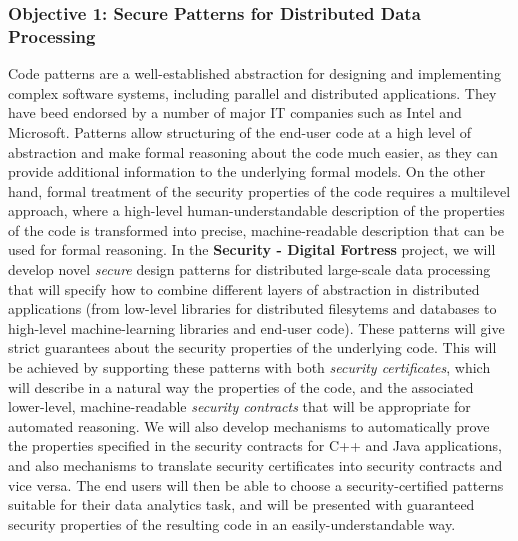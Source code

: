 \documentclass[a4paper,11pt]{article}
\newcommand{\project}[1]{\textbf{#1}\xspace}
\newcommand{\SECURITY}{\project{Security - Digital Fortress}}
\newcommand{\TheProject}{\SECURITY}
\begin{document}
\subsubsection*{Objective 1: Secure Patterns for Distributed Data Processing}
\vspace{-6pt}
Code patterns are a well-established abstraction for designing and implementing complex software systems, including parallel and distributed applications.  They have beed endorsed by a number of major IT companies such as Intel and Microsoft. Patterns allow structuring of the end-user code at a high level of abstraction and make formal reasoning about the code much easier, as they can provide additional information to the underlying formal models. On the other hand, formal treatment of the security properties of the code requires a multilevel approach, where a high-level human-understandable description of the properties of the code is transformed into precise, machine-readable description that can be used for formal reasoning. In the \TheProject{} project, we will develop novel \emph{secure} design patterns for distributed large-scale data processing that will specify how to combine different layers of abstraction in distributed applications (from low-level libraries for distributed filesytems and databases to high-level machine-learning libraries and end-user code). These patterns will give strict guarantees about the security properties of the underlying code. This will be achieved by supporting these patterns with both \emph{security certificates}, which will describe in a natural way the properties of the code, and the associated lower-level, machine-readable \emph{security contracts} that will be appropriate for automated reasoning. We will also develop mechanisms to automatically prove the properties specified in the security contracts for C++ and Java applications, and also mechanisms to translate security certificates into security contracts and vice versa. The end users will then be able to choose a security-certified patterns suitable for their data analytics task, and will be presented with guaranteed security properties of the resulting code in an easily-understandable way. 
\end{document}
